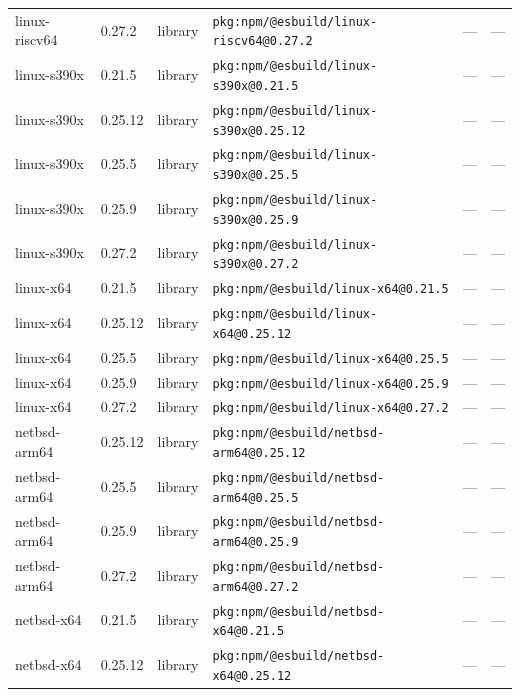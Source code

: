 \documentclass[11pt,a4paper]{article}
\begin{document}
\begin{longtable}{|p{4cm}|p{2cm}|p{1.6cm}|p{5cm}|p{1.5cm}|p{3.5cm}|}
\raggedright linux-riscv64 & 0.27.2 & library & \small\texttt{pkg:npm/@esbuild/linux-riscv64@0.27.2} & — & \small — \\
\raggedright linux-s390x & 0.21.5 & library & \small\texttt{pkg:npm/@esbuild/linux-s390x@0.21.5} & — & \small — \\
\raggedright linux-s390x & 0.25.12 & library & \small\texttt{pkg:npm/@esbuild/linux-s390x@0.25.12} & — & \small — \\
\raggedright linux-s390x & 0.25.5 & library & \small\texttt{pkg:npm/@esbuild/linux-s390x@0.25.5} & — & \small — \\
\raggedright linux-s390x & 0.25.9 & library & \small\texttt{pkg:npm/@esbuild/linux-s390x@0.25.9} & — & \small — \\
\raggedright linux-s390x & 0.27.2 & library & \small\texttt{pkg:npm/@esbuild/linux-s390x@0.27.2} & — & \small — \\
\raggedright linux-x64 & 0.21.5 & library & \small\texttt{pkg:npm/@esbuild/linux-x64@0.21.5} & — & \small — \\
\raggedright linux-x64 & 0.25.12 & library & \small\texttt{pkg:npm/@esbuild/linux-x64@0.25.12} & — & \small — \\
\raggedright linux-x64 & 0.25.5 & library & \small\texttt{pkg:npm/@esbuild/linux-x64@0.25.5} & — & \small — \\
\raggedright linux-x64 & 0.25.9 & library & \small\texttt{pkg:npm/@esbuild/linux-x64@0.25.9} & — & \small — \\
\raggedright linux-x64 & 0.27.2 & library & \small\texttt{pkg:npm/@esbuild/linux-x64@0.27.2} & — & \small — \\
\raggedright netbsd-arm64 & 0.25.12 & library & \small\texttt{pkg:npm/@esbuild/netbsd-arm64@0.25.12} & — & \small — \\
\raggedright netbsd-arm64 & 0.25.5 & library & \small\texttt{pkg:npm/@esbuild/netbsd-arm64@0.25.5} & — & \small — \\
\raggedright netbsd-arm64 & 0.25.9 & library & \small\texttt{pkg:npm/@esbuild/netbsd-arm64@0.25.9} & — & \small — \\
\raggedright netbsd-arm64 & 0.27.2 & library & \small\texttt{pkg:npm/@esbuild/netbsd-arm64@0.27.2} & — & \small — \\
\raggedright netbsd-x64 & 0.21.5 & library & \small\texttt{pkg:npm/@esbuild/netbsd-x64@0.21.5} & — & \small — \\
\raggedright netbsd-x64 & 0.25.12 & library & \small\texttt{pkg:npm/@esbuild/netbsd-x64@0.25.12} & — & \small — \\

\end{longtable}
\end{document}

